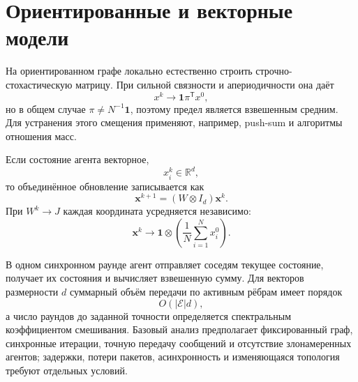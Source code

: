 \section{Ориентированные и векторные модели}

На ориентированном графе локально естественно строить
строчно-стохастическую матрицу. При сильной связности и
апериодичности она даёт
\[
    x^k\longrightarrow
    \mathbf1\pi^{\mathsf T}x^0,
\]
но в общем случае \(\pi\ne N^{-1}\mathbf1\), поэтому предел является
взвешенным средним. Для устранения этого смещения применяют, например,
push-sum и алгоритмы отношения масс.

Если состояние агента векторное,
\[
    x_i^k\in\mathbb R^d,
\]
то объединённое обновление записывается как
\[
    \mathbf x^{k+1}
    =
    (W\otimes I_d)\mathbf x^k.
\]
При \(W^k\to J\) каждая координата усредняется независимо:
\[
    \mathbf x^k
    \longrightarrow
    \mathbf1\otimes
    \left(
        \frac1N\sum_{i=1}^{N}x_i^0
    \right).
\]

В одном синхронном раунде агент отправляет соседям текущее состояние,
получает их состояния и вычисляет взвешенную сумму. Для векторов
размерности \(d\) суммарный объём передачи по активным рёбрам имеет
порядок
\[
    O(|\mathcal E|d),
\]
а число раундов до заданной точности определяется спектральным
коэффициентом смешивания. Базовый анализ предполагает фиксированный
граф, синхронные итерации, точную передачу сообщений и отсутствие
злонамеренных агентов; задержки, потери пакетов, асинхронность и
изменяющаяся топология требуют отдельных условий.
